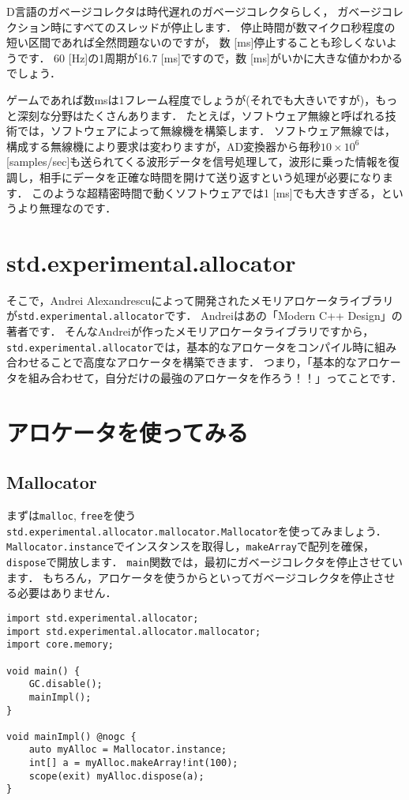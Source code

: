 D言語のガベージコレクタは時代遅れのガベージコレクタらしく，
ガベージコレクション時にすべてのスレッドが停止します．
停止時間が数マイクロ秒程度の短い区間であれば全然問題ないのですが，
数 [ms]停止することも珍しくないようです． 60 [Hz]の1周期が16.7
{[}ms{]}ですので，数 [ms]がいかに大きな値かわかるでしょう．

ゲームであれば数msは1フレーム程度でしょうが(それでも大きいですが)，もっと深刻な分野はたくさんあります．
たとえば，ソフトウェア無線と呼ばれる技術では，ソフトウェアによって無線機を構築します．
ソフトウェア無線では，構成する無線機により要求は変わりますが，AD変換器から毎秒$10 \times 10^6$ [samples/sec]も送られてくる波形データを信号処理して，波形に乗った情報を復調し，相手にデータを正確な時間を開けて送り返すという処理が必要になります．
このような超精密時間で動くソフトウェアでは1
{[}ms{]}でも大きすぎる，というより無理なのです．


\section{std.experimental.allocator}

そこで，Andrei Alexandrescuによって開発されたメモリアロケータライブラリが\texttt{std.experimental.allocator}です．
Andreiはあの「Modern C++ Design」の著者です．
そんなAndreiが作ったメモリアロケータライブラリですから，
\texttt{std.experimental.allocator}では，基本的なアロケータをコンパイル時に組み合わせることで高度なアロケータを構築できます．
つまり，「基本的なアロケータを組み合わせて，自分だけの最強のアロケータを作ろう！！」ってことです．


\section{アロケータを使ってみる}


\subsection{Mallocator}

まずは\texttt{malloc},
\texttt{free}を使う\texttt{std.experimental.allocator.mallocator.Mallocator}を使ってみましょう．
\texttt{Mallocator.instance}でインスタンスを取得し，\texttt{makeArray}で配列を確保，\texttt{dispose}で開放します．
\texttt{main}関数では，最初にガベージコレクタを停止させています．
もちろん，アロケータを使うからといってガベージコレクタを停止させる必要はありません．

\begin{lstlisting}[]
import std.experimental.allocator;
import std.experimental.allocator.mallocator;
import core.memory;

void main() {
    GC.disable();
    mainImpl();
}

void mainImpl() @nogc {
    auto myAlloc = Mallocator.instance;
    int[] a = myAlloc.makeArray!int(100);
    scope(exit) myAlloc.dispose(a);
}
\end{lstlisting}


